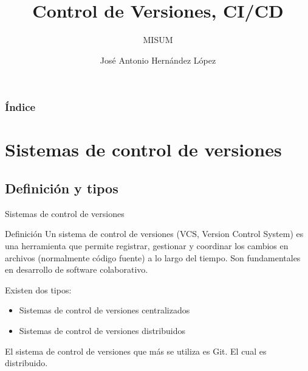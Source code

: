 \documentclass{beamer}
\title[Control de Versiones, CI/CD] %
{Control de Versiones, CI/CD}
\subtitle{MISUM}
\author[José A.] %
{José Antonio Hernández López\inst{1}}
\institute[UMU] %
{
  \inst{1}%
  Departamento de Informática y Sistemas\\
  Universidad de Murcia
}
\begin{document}
\frame{\titlepage}

\begin{frame}
\frametitle{Índice}
\tableofcontents
\end{frame}

\section{Sistemas de control de versiones}

\subsection{Definición y tipos}

\begin{frame}{Sistemas de control de versiones}

\begin{block}{Definición}
Un sistema de control de versiones (VCS, Version Control System) es una herramienta que permite registrar, gestionar y coordinar los cambios en archivos (normalmente código fuente) a lo largo del tiempo. Son fundamentales en desarrollo de software colaborativo.
\end{block}

\pause

Existen dos tipos:

\begin{itemize}
    \item Sistemas de control de versiones centralizados
    \item Sistemas de control de versiones distribuidos
\end{itemize}

El sistema de control de versiones que más se utiliza es Git. El cual es distribuido.
    
\end{frame}
\end{document}
